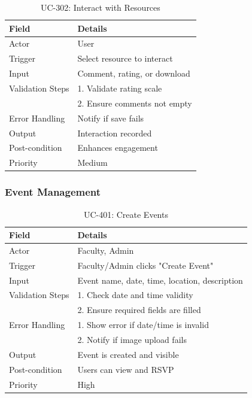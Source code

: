 \begin{table}[H]
\centering
\caption{UC-302: Interact with Resources}
\begin{tabular}{|l|p{10cm}|}
\hline
\textbf{Field} & \textbf{Details} \\ \hline
Actor & User \\ \hline
Trigger & Select resource to interact \\ \hline
Input & Comment, rating, or download \\ \hline
Validation Steps & 1. Validate rating scale \\ 
                 & 2. Ensure comments not empty \\ \hline
Error Handling & Notify if save fails \\ \hline
Output & Interaction recorded \\ \hline
Post-condition & Enhances engagement \\ \hline
Priority & Medium \\ \hline
\end{tabular}
\end{table}


\subsubsection{Event Management}
\begin{table}[H]
\centering
\caption{UC-401: Create Events}
\begin{tabular}{|l|p{10cm}|}
\hline
\textbf{Field} & \textbf{Details} \\ \hline
Actor & Faculty, Admin \\ \hline
Trigger & Faculty/Admin clicks "Create Event" \\ \hline
Input & Event name, date, time, location, description \\ \hline
Validation Steps & 1. Check date and time validity \\ 
                 & 2. Ensure required fields are filled \\ \hline
Error Handling & 1. Show error if date/time is invalid \\ 
               & 2. Notify if image upload fails \\ \hline
Output & Event is created and visible \\ \hline
Post-condition & Users can view and RSVP \\ \hline
Priority & High \\ \hline
\end{tabular}
\end{table}

